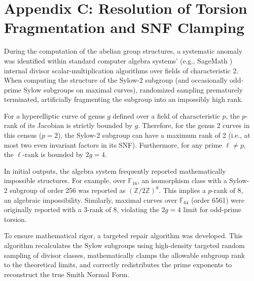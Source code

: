 \documentclass[letterpaper, 11pt]{article}
\begin{document}
\section{Appendix C: Resolution of Torsion Fragmentation and SNF Clamping}
During the computation of the abelian group structures, a systematic anomaly was identified within standard computer algebra systems' (e.g., SageMath \cite{SageMath2026}) internal divisor scalar-multiplication algorithms over fields of characteristic 2. When computing the structure of the Sylow-2 subgroup (and occasionally odd-prime Sylow subgroups on maximal curves), randomized sampling prematurely terminated, artificially fragmenting the subgroup into an impossibly high rank. 

For a hyperelliptic curve of genus $g$ defined over a field of characteristic $p$, the $p$-rank of its Jacobian is strictly bounded by $g$. Therefore, for the genus 2 curves in this census ($p=2$), the Sylow-2 subgroup can have a maximum rank of 2 (i.e., at most two even invariant factors in its SNF). Furthermore, for any prime $\ell \neq p$, the $\ell$-rank is bounded by $2g = 4$. 

In initial outputs, the algebra system frequently reported mathematically impossible structures. For example, over $\mathbb{F}_{16}$, an isomorphism class with a Sylow-2 subgroup of order 256 was reported as $(\mathbb{Z}/2\mathbb{Z})^8$. This implies a $p$-rank of 8, an algebraic impossibility. Similarly, maximal curves over $\mathbb{F}_{64}$ (order 6561) were originally reported with a 3-rank of 8, violating the $2g=4$ limit for odd-prime torsion. 

To ensure mathematical rigor, a targeted repair algorithm was developed. This algorithm recalculates the Sylow subgroups using high-density targeted random sampling of divisor classes, mathematically clamps the allowable subgroup rank to the theoretical limits, and correctly redistributes the prime exponents to reconstruct the true Smith Normal Form. 
\end{document}
